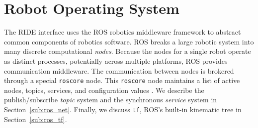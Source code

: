 % 
% 
% 
% 


\section{Robot Operating System}
The RIDE interface uses the ROS robotics middleware framework to abstract common components of robotics software. ROS breaks a large robotic system into many discrete computational \emph{nodes}. Because the nodes for a single robot operate as distinct processes, potentially across multiple platforms, ROS provides communication middleware. The communication between nodes is brokered through a special \verb!roscore! node. This \verb!roscore! node maintains a list of active nodes, topics, services, and configuration values \cite{ROS09}. We describe the publish/subscribe \emph{topic} system and the synchronous \emph{service} system in Section~\ref{sub:ros_net}. Finally, we discuss \verb!tf!, ROS's built-in kinematic tree in Section~\ref{sub:ros_tf}.

